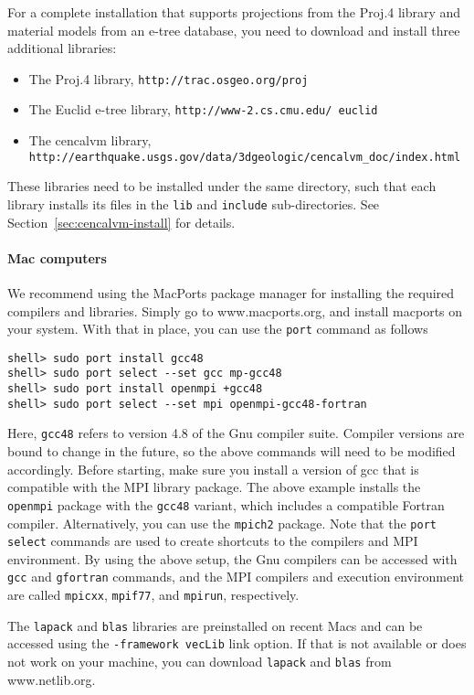 \documentclass[11pt]{article}
\begin{document}
For a complete installation that supports projections from the Proj.4 library and material models
from an e-tree database, you need to download and install three additional libraries:
\begin{itemize}
\item The Proj.4 library, {\tt http://trac.osgeo.org/proj}
\item The Euclid e-tree library, {\tt http://www-2.cs.cmu.edu/~euclid}
\item The cencalvm library, \\{\tt http://earthquake.usgs.gov/data/3dgeologic/cencalvm\_doc/index.html}
\end{itemize}
These libraries need to be installed under the same directory, such that each library installs its
files in the {\tt lib} and {\tt include} sub-directories. See Section~\ref{sec:cencalvm-install} for
details.

\paragraph{Mac computers}

We recommend using the MacPorts package manager for installing the required compilers and
libraries. Simply go to www.macports.org, and install macports on your system. With that in place,
you can use the \verb+port+ command as follows
\begin{verbatim}
shell> sudo port install gcc48
shell> sudo port select --set gcc mp-gcc48
shell> sudo port install openmpi +gcc48
shell> sudo port select --set mpi openmpi-gcc48-fortran
\end{verbatim}
Here, \verb+gcc48+ refers to version 4.8 of the Gnu compiler suite. Compiler versions are bound to
change in the future, so the above commands will need to be modified accordingly. Before starting,
make sure you install a version of gcc that is compatible with the MPI library package. The above
example installs the \verb+openmpi+ package with the \verb+gcc48+ variant, which includes a
compatible Fortran compiler. Alternatively, you can use the \verb+mpich2+ package. Note that the
\verb+port select+ commands are used to create shortcuts to the compilers and MPI environment. By
using the above setup, the Gnu compilers can be accessed with \verb+gcc+ and \verb+gfortran+
commands, and the MPI compilers and execution environment are called \verb+mpicxx+, \verb+mpif77+,
and \verb+mpirun+, respectively.

The \verb+lapack+ and \verb+blas+ libraries are preinstalled on recent Macs and can be accessed
using the \verb+-framework vecLib+ link option. If that is not available or does not work on your
machine, you can download \verb+lapack+ and \verb+blas+ from www.netlib.org.
\end{document}
